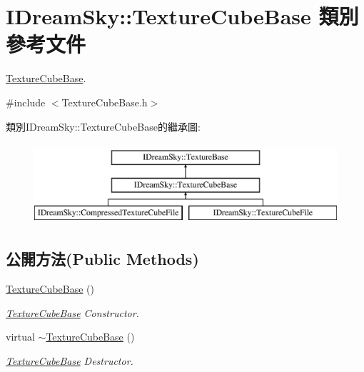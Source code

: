 \hypertarget{class_i_dream_sky_1_1_texture_cube_base}{}\section{I\+Dream\+Sky\+:\+:Texture\+Cube\+Base 類別 參考文件}
\label{class_i_dream_sky_1_1_texture_cube_base}


\hyperlink{class_i_dream_sky_1_1_texture_cube_base}{Texture\+Cube\+Base}.  




{\ttfamily \#include $<$Texture\+Cube\+Base.\+h$>$}

類別\+I\+Dream\+Sky\+:\+:Texture\+Cube\+Base的繼承圖\+:\begin{figure}[H]
\begin{center}
\leavevmode
\includegraphics[height=3.000000cm]{class_i_dream_sky_1_1_texture_cube_base}
\end{center}
\end{figure}
\subsection*{公開方法(Public Methods)}
\begin{DoxyCompactItemize}
\item 
\hyperlink{class_i_dream_sky_1_1_texture_cube_base_abf44845c6a09e7245ca681d97d729388}{Texture\+Cube\+Base} ()
\begin{DoxyCompactList}\small\item\em \hyperlink{class_i_dream_sky_1_1_texture_cube_base}{Texture\+Cube\+Base} Constructor. \end{DoxyCompactList}\item 
virtual \hyperlink{class_i_dream_sky_1_1_texture_cube_base_a72aeb70db975ea7f6058e508f5ef648b}{$\sim$\+Texture\+Cube\+Base} ()
\begin{DoxyCompactList}\small\item\em \hyperlink{class_i_dream_sky_1_1_texture_cube_base}{Texture\+Cube\+Base} Destructor. \end{DoxyCompactList}\end{DoxyCompactItemize}


